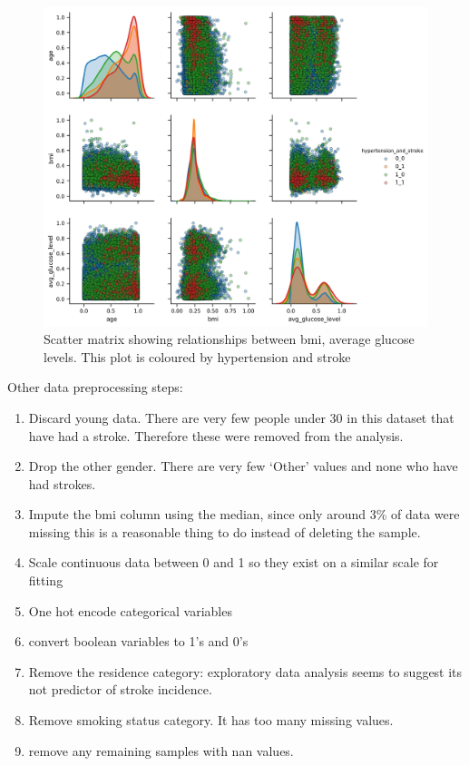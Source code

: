 \documentclass[12pt]{article}
\begin{document}
    \begin{figure}[t]
        \includegraphics[width=\textwidth]{../data/Plots/scatter_matrix/proc_hypertension.png}
        \caption{Scatter matrix showing relationships between bmi, average glucose levels. This plot is coloured by
        hypertension and stroke}
        \label{fig:scatter_matrix}
    \end{figure}

    Other data preprocessing steps:
    \begin{enumerate}
        \item Discard young data. There are very few people under 30 in this dataset that have had a stroke. Therefore these were removed from the analysis.
        \item Drop the other gender. There are very few `Other' values and none who have had strokes.
        \item Impute the bmi column using the median, since only around 3\% of data were missing this is a reasonable thing to do instead of deleting the sample.
        \item Scale continuous data between 0 and 1 so they exist on a similar scale for fitting
        \item One hot encode categorical variables
        \item convert boolean variables to 1's and 0's
        \item Remove the residence category: exploratory data analysis seems to suggest its not predictor of stroke incidence.
        \item Remove smoking status category. It has too many missing values.
        \item remove any remaining samples with nan values.
    \end{enumerate}
\end{document}
